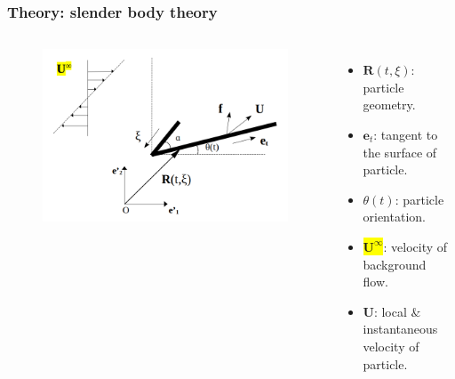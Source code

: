 \documentclass{beamer}
\newcommand{\bi}{\begin{itemize}}
\newcommand{\ei}{\end{itemize}}
\begin{document}
\begin{frame}
	\frametitle{Theory: slender body theory}
	\begin{overlayarea}{\textwidth}{\textheight}
		\vspace{-0.8cm}
		\begin{columns}
			\begin{figure}[htb]
				\begin{center}
					\includegraphics[width=1\textwidth]{plots/rigid_particle5.png}
				\end{center}
			\end{figure}
			\small \bi 
			\item $\mathbf{R}(t,\xi)$: particle geometry.
			\item $\mathbf{e}_t$: tangent to the surface of particle.
			\item $\theta(t)$: particle orientation.
			\item \colorbox{yellow}{$\mathbf{U}^\infty$}: velocity of background flow.
			\item $\mathbf{U}$: local $\&$ instantaneous velocity of particle.
			\ei
		\end{columns}\vspace{0.5cm}
	\end{overlayarea}
\end{frame}

\end{document}
